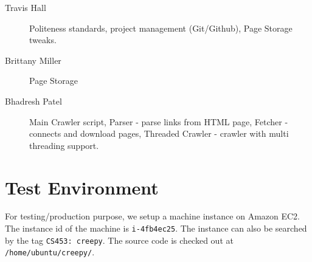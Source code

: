 \documentclass[letterpaper,11pt,twoside]{article}
\begin{document}
\begin{description}
 \item[Travis Hall] Politeness standards, project management (Git/Github), Page Storage tweaks.
 \item[Brittany Miller] Page Storage
 \item[Bhadresh Patel] Main Crawler script, Parser - parse links from HTML page, Fetcher - connects and download pages, Threaded Crawler - crawler with multi threading support.
\end{description}

\section{Test Environment}
For testing/production purpose, we setup a machine instance on Amazon EC2. The instance id of the machine is \texttt{i-4fb4ec25}. The instance can also be searched by the tag \texttt{CS453: creepy}. The source code is checked out at \texttt{/home/ubuntu/creepy/}.
\end{document}
